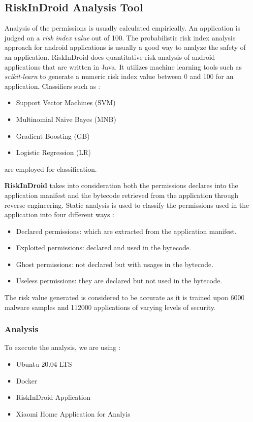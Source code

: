 \documentclass[runningheads]{llncs}
\begin{document}
\subsection{RiskInDroid Analysis Tool}
Analysis of the permissions is usually calculated empirically. An application is judged on a \textit{risk index value} out of 100.
The probabilistic risk index analysis approach for android applications is usually a good way to analyze the safety of an application.
RiskInDroid does quantitative risk analysis of android applications that are written in Java. It utilizes machine learning tools such as \textit{scikit-learn}
to generate a numeric risk index value between 0 and 100 for an application. Classifiers such as : \begin{itemize}
    \item Support Vector Machines (SVM)
    \item Multinomial Naive Bayes (MNB)
    \item Gradient Boosting (GB)
    \item Logistic Regression (LR)
\end{itemize}
are employed for classification. 

\textbf{RiskInDroid} takes into consideration both the permissions declares into the application manifest and the bytecode retrieved from the application through reverse engineering. Static analysis is used to classify the permissions used in the application into four different ways :
\begin{itemize}
    \item Declared permissions: which are extracted from the application manifest.
    \item Exploited permissions: declared and used in the bytecode.
    \item Ghost permissions: not declared but with usages in the bytecode.
    \item Useless permissions: they are declared but not used in the bytecode.
\end{itemize}

The risk value generated is considered to be accurate as it is trained upon 6000 malware samples and 112000 applications of varying levels of security.

\subsubsection{Analysis}
To execute the analysis, we are using : 
\begin{itemize}
    \item Ubuntu 20.04 LTS
    \item Docker 
    \item RiskInDroid Application
    \item Xiaomi Home Application for Analyis
\end{itemize}
\end{document}
